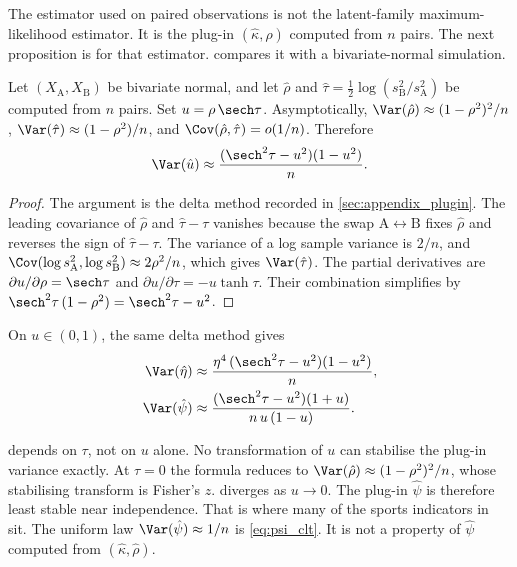 The estimator used on paired observations is not the latent-family maximum-likelihood estimator.
It is the plug-in $(\hat\kappa,\hat\rho)$ computed from $n$ pairs.
The next proposition is for that estimator.
 compares it with a bivariate-normal simulation.

\begin{proposition}
\label{prop:plugin}
Let $(X_{\mathrm{A}},X_{\mathrm{B}})$ be bivariate normal, and let $\hat\rho$ and $\hat\tau = \tfrac{1}{2}\log(s_{\mathrm{B}}^{2}/s_{\mathrm{A}}^{2})$ be computed from $n$ pairs.
Set $u = \rho\,\sech\tau$.
Asymptotically, $\Var(\hat\rho)\approx(1-\rho^{2})^{2}/n$, $\Var(\hat\tau)\approx(1-\rho^{2})/n$, and $\Cov(\hat\rho,\hat\tau) = o(1/n)$.
Therefore
\begin{equation}
  \Var(\hat u)
  \approx \frac{(\sech^{2}\tau - u^{2})(1-u^{2})}{n}.
  \label{eq:var_u_plugin}
\end{equation}
\end{proposition}

\begin{proof}
The argument is the delta method recorded in \cref{sec:appendix_plugin}.
The leading covariance of $\hat\rho$ and $\hat\tau-\tau$ vanishes because the swap $\mathrm{A}\leftrightarrow\mathrm{B}$ fixes $\hat\rho$ and reverses the sign of $\hat\tau-\tau$.
The variance of a log sample variance is $2/n$, and $\Cov(\log s_{\mathrm{A}}^{2},\log s_{\mathrm{B}}^{2})\approx 2\rho^{2}/n$, which gives $\Var(\hat\tau)$.
The partial derivatives are $\partial u/\partial\rho = \sech\tau$ and $\partial u/\partial\tau = -u\tanh\tau$.
Their combination simplifies by $\sech^{2}\tau\,(1-\rho^{2}) = \sech^{2}\tau - u^{2}$.
\end{proof}

\begin{corollary}
\label{cor:plugin_eta_psi}
On $u\in(0,1)$, the same delta method gives
\begin{align}
  \Var(\hat\eta)
  &\approx \frac{\eta^{4}\,(\sech^{2}\tau-u^{2})(1-u^{2})}{n},
  \label{eq:var_eta_plugin}\\
  \Var(\hat\psi)
  &\approx \frac{(\sech^{2}\tau-u^{2})(1+u)}{n\, u\,(1-u)}.
  \label{eq:var_psi_plugin}
\end{align}
\end{corollary}

 depends on $\tau$, not on $u$ alone.
No transformation of $u$ can stabilise the plug-in variance exactly.
At $\tau = 0$ the formula reduces to $\Var(\hat\rho)\approx(1-\rho^{2})^{2}/n$, whose stabilising transform is Fisher's $z$.
 diverges as $u\to 0$.
The plug-in $\hat\psi$ is therefore least stable near independence.
That is where many of the sports indicators in \textcite{brownPEFempirical} sit.
The uniform law $\Var(\hat\psi)\approx 1/n$ is \cref{eq:psi_clt}.
It is not a property of $\hat\psi$ computed from $(\hat\kappa,\hat\rho)$.
